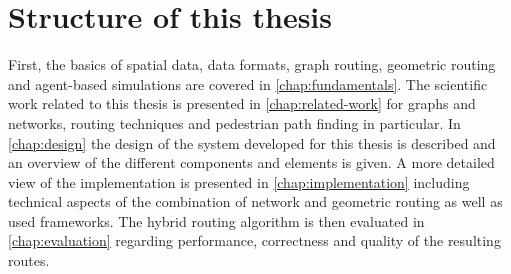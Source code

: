 \section{Structure of this thesis}

	First, the basics of spatial data, data formats, graph routing, geometric routing and agent-based simulations are covered in \cref{chap:fundamentals}.
	The scientific work related to this thesis is presented in \cref{chap:related-work} for graphs and networks, routing techniques and pedestrian path finding in particular.
	In \cref{chap:design} the design of the system developed for this thesis is described and an overview of the different components and elements is given.
	A more detailed view of the implementation is presented in \cref{chap:implementation} including technical aspects of the combination of network and geometric routing as well as used frameworks.
	The hybrid routing algorithm is then evaluated in \cref{chap:evaluation} regarding performance, correctness and quality of the resulting routes.
	
